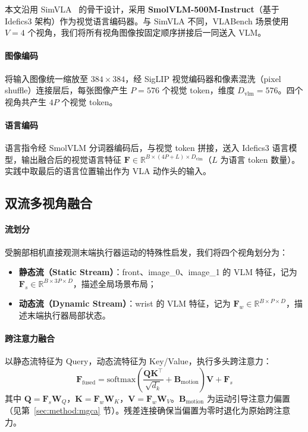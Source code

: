 \documentclass[10pt,twocolumn]{article}
\begin{document}
本文沿用 SimVLA~\cite{simvla2026} 的骨干设计，采用 \textbf{SmolVLM-500M-Instruct}（基于 Idefics3 架构）作为视觉语言编码器。与 SimVLA 不同，VLABench 场景使用 $V=4$ 个视角，我们将所有视角图像按固定顺序拼接后一同送入 VLM。

\paragraph{图像编码}
将输入图像统一缩放至 $384 \times 384$，经 SigLIP 视觉编码器和像素混洗（pixel shuffle）连接层后，每张图像产生 $P=576$ 个视觉 token，维度 $D_{\text{vlm}}=576$。四个视角共产生 $4P$ 个视觉 token。

\paragraph{语言编码}
语言指令经 SmolVLM 分词器编码后，与视觉 token 拼接，送入 Idefics3 语言模型，输出融合后的视觉语言特征 $\mathbf{F} \in \mathbb{R}^{B \times (4P + L) \times D_{\text{vlm}}}$（$L$ 为语言 token 数量）。实践中取最后的语言位置输出作为 VLA 动作头的输入。

\subsection{双流多视角融合}
\label{sec:method:dualstream}

\paragraph{流划分}
受腕部相机直接观测末端执行器运动的特殊性启发，我们将四个视角划分为：
\begin{itemize}[leftmargin=*]
  \item \textbf{静态流（Static Stream）}：front、image\_0、image\_1 的 VLM 特征，记为 $\mathbf{F}_s \in \mathbb{R}^{B \times 3P \times D}$，描述全局场景布局；
  \item \textbf{动态流（Dynamic Stream）}：wrist 的 VLM 特征，记为 $\mathbf{F}_w \in \mathbb{R}^{B \times P \times D}$，描述末端执行器局部状态。
\end{itemize}

\paragraph{跨注意力融合}
以静态流特征为 Query，动态流特征为 Key/Value，执行多头跨注意力：
\begin{equation}
  \mathbf{F}_{\text{fused}} = \text{softmax}\!\left(\frac{\mathbf{Q}\mathbf{K}^\top}{\sqrt{d_k}} + \mathbf{B}_{\text{motion}}\right)\mathbf{V} + \mathbf{F}_s
  \label{eq:crossattn}
\end{equation}
其中 $\mathbf{Q} = \mathbf{F}_s \mathbf{W}_Q$，$\mathbf{K} = \mathbf{F}_w \mathbf{W}_K$，$\mathbf{V} = \mathbf{F}_w \mathbf{W}_V$。$\mathbf{B}_{\text{motion}}$ 为运动引导注意力偏置（见第~\ref{sec:method:mgca} 节）。残差连接确保当偏置为零时退化为原始跨注意力。
\end{document}
